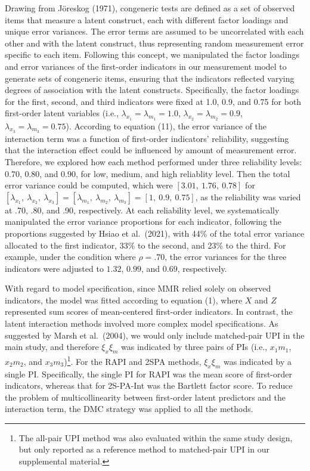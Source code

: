 \documentclass[
  man,mask]{apa6}
\begin{document}
Drawing from Jöreskog (1971), congeneric tests are defined as a set of observed items that measure a latent construct, each with different factor loadings and unique error variances. The error terms are assumed to be uncorrelated with each other and with the latent construct, thus representing random measurement error specific to each item. Following this concept, we manipulated the factor loadings and error variances of the first-order indicators in our measurement model to generate sets of congeneric items, ensuring that the indicators reflected varying degrees of association with the latent constructs. Specifically, the factor loadings for the first, second, and third indicators were fixed at 1.0, 0.9, and 0.75 for both first-order latent variables (i.e., \(\lambda_{x_{1}} = \lambda_{m_{1}} = 1.0\), \(\lambda_{x_{2}} = \lambda_{m_{2}} = 0.9\), \(\lambda_{x_{3}} = \lambda_{m_{3}} = 0.75\)). According to equation (11), the error variance of the interaction term was a function of first-order indicators' reliability, suggesting that the interaction effect could be influenced by amount of measurement error. Therefore, we explored how each method performed under three reliability levels: 0.70, 0.80, and 0.90, for low, medium, and high reliablity level. Then the total error variance could be computed, which were \([3.01, \ 1.76, \ 0.78]\) for \([\lambda_{x_{1}}, \ \lambda_{x_{2}}, \ \lambda_{x_{3}}] = [\lambda_{m_{1}}, \ \lambda_{m_{2}}, \ \lambda_{m_{3}}] = [1, \ 0.9, \ 0.75]\), as the reliability was varied at .70, .80, and .90, respectively. At each reliability level, we systematically manipulated the error variance proportions for each indicator, following the proportions suggested by Hsiao et al.~(2021), with 44\% of the total error variance allocated to the first indicator, 33\% to the second, and 23\% to the third. For example, under the condition where \(\rho = .70\), the error variances for the three indicators were adjusted to \(1.32\), \(0.99\), and \(0.69\), respectively.

With regard to model specification, since MMR relied solely on observed indicators, the model was fitted according to equation (1), where \(X\) and \(Z\) represented sum scores of mean-centered first-order indicators. In contrast, the latent interaction methods involved more complex model specifications. As suggested by Marsh et al.~(2004), we would only include matched-pair UPI in the main study, and therefore \(\xi_{x}\xi_{m}\) was indicated by three pairs of PIs (i.e., \(x_{1}m_{1}\), \(x_{2}m_{2}\), and \(x_{3}m_{3}\))\footnote{The all-pair UPI method was also evaluated within the same study design, but only reported as a reference method to matched-pair UPI in our supplemental material.}. For the RAPI and 2SPA methods, \(\xi_{x}\xi_{m}\) was indicated by a single PI. Specifically, the single PI for RAPI was the mean score of first-order indicators, whereas that for 2S-PA-Int was the Bartlett factor score. To reduce the problem of multicollinearity between first-order latent predictors and the interaction term, the DMC strategy was applied to all the methods.
\end{document}
